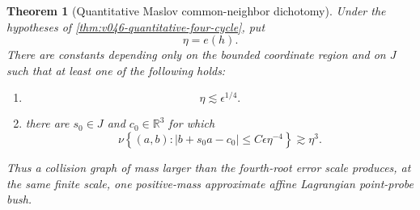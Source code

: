 \documentclass[10pt]{article}
\newtheorem{theorem}{Theorem}[section]
\newcommand{\R}{\mathbb R}
\begin{document}
\begin{theorem}[Quantitative Maslov common-neighbor dichotomy]
\label{thm:v046-common-neighbor-dichotomy}
Under the hypotheses of \cref{thm:v046-quantitative-four-cycle}, put
\[
\eta=e(h).
\]
There are constants depending only on the bounded coordinate region and on \(J\) such that at
least one of the following holds:
\begin{enumerate}[label=\textnormal{(\roman*)}]
\item
\begin{equation}
\label{eq:v046-common-neighbor-small}
\boxed{
\eta\lesssim \epsilon^{1/4}.
}
\end{equation}
\item there are \(s_0\in J\) and \(c_0\in\R^3\) for which
\begin{equation}
\label{eq:v046-common-neighbor-bush}
\boxed{
\nu\left\{(a,b):|b+s_0a-c_0|
\le C\epsilon\eta^{-4}\right\}
\gtrsim \eta^3.
}
\end{equation}
\end{enumerate}
Thus a collision graph of mass larger than the fourth-root error scale produces, at the same
finite scale, one positive-mass approximate affine Lagrangian point-probe bush.
\end{theorem}
\end{document}
